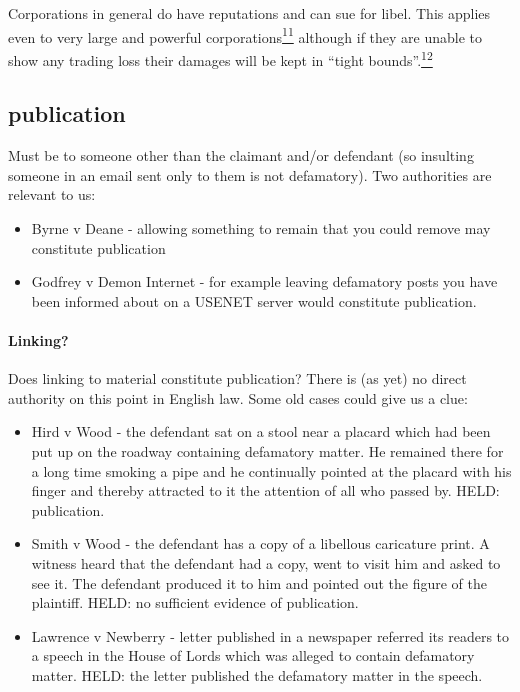 \documentclass[]{article}
\begin{document}
{Corporations in general do have reputations and can sue for libel. This
applies even to very large and powerful
corporations\hyperref[sdfootnote11sym]{\textsuperscript{11}} although if
they are unable to show any trading loss their damages will be kept in
``tight bounds''.\hyperref[sdfootnote12sym]{\textsuperscript{12}} }

\subsection{publication}

Must be to someone other than the claimant and/or defendant (so
insulting someone in an email sent only to them is not defamatory). Two
authorities are relevant to us:

\begin{itemize}
\item
  Byrne v Deane - allowing something to remain that you could remove may
  constitute publication
\item
  Godfrey v Demon Internet - for example leaving defamatory posts you
  have been informed about on a USENET server would constitute
  publication.
\end{itemize}

\paragraph{Linking?}

Does linking to material constitute publication? There is (as yet) no
direct authority on this point in English law. Some old cases could give
us a clue:

\begin{itemize}
\item
  Hird v Wood - the defendant sat on a stool near a placard which had
  been put up on the roadway containing defamatory matter. He remained
  there for a long time smoking a pipe and he continually pointed at the
  placard with his finger and thereby attracted to it the attention of
  all who passed by. HELD: publication.
\item
  Smith v Wood - the defendant has a copy of a libellous caricature
  print. A witness heard that the defendant had a copy, went to visit
  him and asked to see it. The defendant produced it to him and pointed
  out the figure of the plaintiff. HELD: no sufficient evidence of
  publication.
\item
  Lawrence v Newberry - letter published in a newspaper referred its
  readers to a speech in the House of Lords which was alleged to contain
  defamatory matter. HELD: the letter published the defamatory matter in
  the speech.
\end{itemize}
\end{document}
